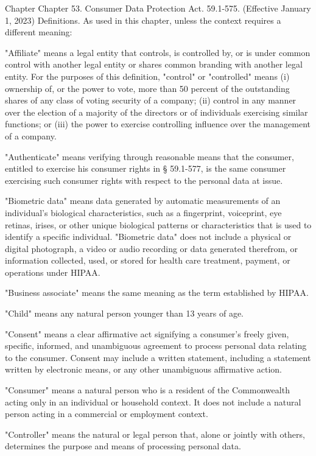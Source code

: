 Chapter 
Chapter 53. Consumer Data Protection Act.
59.1-575. (Effective January 1, 2023) Definitions.
As used in this chapter, unless the context requires a different meaning:

"Affiliate" means a legal entity that controls, is controlled by, or is under common control with another legal entity or shares common branding with another legal entity. For the purposes of this definition, "control" or "controlled" means (i) ownership of, or the power to vote, more than 50 percent of the outstanding shares of any class of voting security of a company; (ii) control in any manner over the election of a majority of the directors or of individuals exercising similar functions; or (iii) the power to exercise controlling influence over the management of a company.

"Authenticate" means verifying through reasonable means that the consumer, entitled to exercise his consumer rights in § 59.1-577, is the same consumer exercising such consumer rights with respect to the personal data at issue.

"Biometric data" means data generated by automatic measurements of an individual's biological characteristics, such as a fingerprint, voiceprint, eye retinas, irises, or other unique biological patterns or characteristics that is used to identify a specific individual. "Biometric data" does not include a physical or digital photograph, a video or audio recording or data generated therefrom, or information collected, used, or stored for health care treatment, payment, or operations under HIPAA.

"Business associate" means the same meaning as the term established by HIPAA.

"Child" means any natural person younger than 13 years of age.

"Consent" means a clear affirmative act signifying a consumer's freely given, specific, informed, and unambiguous agreement to process personal data relating to the consumer. Consent may include a written statement, including a statement written by electronic means, or any other unambiguous affirmative action.

"Consumer" means a natural person who is a resident of the Commonwealth acting only in an individual or household context. It does not include a natural person acting in a commercial or employment context.

"Controller" means the natural or legal person that, alone or jointly with others, determines the purpose and means of processing personal data.

